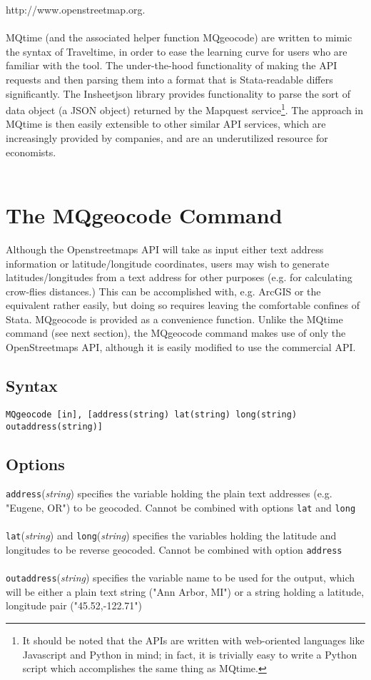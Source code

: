 \documentclass[12pt]{article}
\begin{document}
http://www.openstreetmap.org. 
\\ \\
MQtime (and the associated helper function MQgeocode) are written to mimic the syntax of Traveltime, in order to ease the learning curve for users who are familiar with the tool. The under-the-hood functionality of making the API requests and then parsing them into a format that is Stata-readable differs significantly. The Insheetjson library provides functionality to parse the sort of data object (a JSON object) returned by the Mapquest service\footnote{It should be noted that the APIs are written with web-oriented languages like Javascript and Python in mind; in fact, it is trivially easy to write a Python script which accomplishes the same thing as MQtime.}. The approach in MQtime is then easily extensible to other similar API services, which are increasingly provided by companies, and are an underutilized resource for economists. 
\\ \\
\section{The MQgeocode Command}
Although the Openstreetmaps API will take as input either text address information or latitude/longitude coordinates, users may wish to generate latitudes/longitudes from a text address for other purposes (e.g. for calculating crow-flies distances.) This can be accomplished with, e.g. ArcGIS or the equivalent rather easily, but doing so requires leaving the comfortable confines of Stata. MQgeocode is provided as a convenience function. Unlike the MQtime command (see next section), the MQgeocode command makes use of only the OpenStreetmaps API, although it is easily modified to use the commercial API.

\subsection{Syntax}
\begin{verbatim}
MQgeocode [in], [address(string) lat(string) long(string) outaddress(string)]
\end{verbatim}

\subsection{Options}
\verb|address|(\textit{string}) specifies the variable holding the plain text addresses (e.g. "Eugene, OR") to be geocoded. Cannot be combined with options \verb|lat| and \verb|long|
\\ \\
\verb|lat|(\textit{string}) and \verb|long|(\textit{string}) specifies the variables holding the latitude and longitudes to be reverse geocoded. Cannot be combined with option \verb|address|
\\ \\
\verb|outaddress|(\textit{string}) specifies the variable name to be used for the output, which will be either a plain text string ("Ann Arbor, MI") or a string holding a latitude, longitude pair ("45.52,-122.71")
\end{document}
